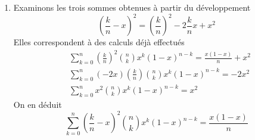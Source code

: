 \begin{enumerate}
\begin{enumerate}
\end{enumerate}
\item  Examinons les trois sommes obtenues {\`a} partir du d{\'e}veloppement
\begin{displaymath}
 (\frac{k}{n}-x)^{2}=(\frac{k}{n})^{2}-2\frac{k}{n}x+x^{2}
\end{displaymath}
Elles correspondent {\`a} des calculs d{\'e}j{\`a} effectu{\'e}s
\begin{align*}
&\sum_{k=0}^{n}(\frac{k}{n})^{2}\binom{n}{k}x^{k}(1-x)^{n-k} =\frac{x(1-x)}{n}+x^{2} \\
&\sum_{k=0}^{n}(-2x)(\frac{k}{n})\binom{n}{k}x^{k}(1-x)^{n-k} =-2x^{2} \\
&\sum_{k=0}^{n}x^{2}\binom{n}{k}x^{k}(1-x)^{n-k} = x^{2}
\end{align*}
On en d{\'e}duit
\begin{displaymath}
 \sum_{k=0}^{n}(\frac{k}{n}-x)^{2}\binom{n}{k}x^{k}(1-x)^{n-k}=\frac{x(1-x)}{n}
\end{displaymath}
\end{enumerate}

